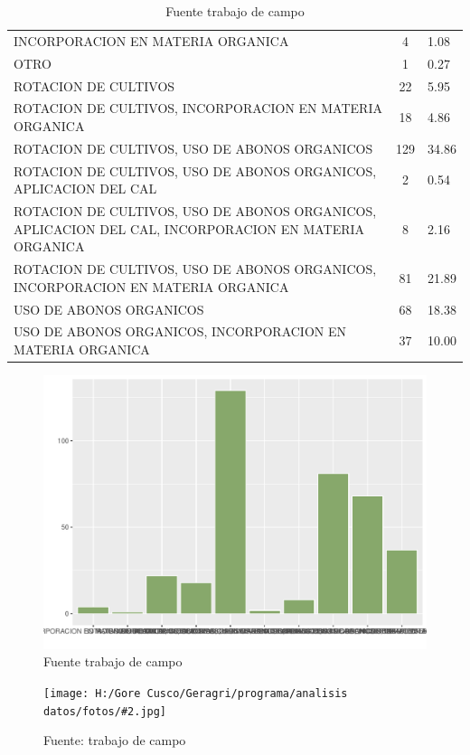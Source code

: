 \documentclass{article}\usepackage[]{graphicx}\usepackage[table]{xcolor}
\makeatletter
\def\maxwidth{ %
  \ifdim\Gin@nat@width>\linewidth
    \linewidth
  \else
    \Gin@nat@width
  \fi
}
\newenvironment{knitrout}{}{} %
\newenvironment{tablas}[2]
{\begin{table}[H]
		\centering
		\caption{#1}
		#2
		\caption*{Fuente trabajo de campo}}
	{\end{table}}
\newenvironment{fotos}[2]
{\begin{figure}[H]
	\centering
	\caption{#1}
	\texttt{[image: H:/Gore Cusco/Geragri/programa/analisis datos/fotos/\#2.jpg]}
	\caption*{Fuente: trabajo de campo}}
{\end{figure}}
\newenvironment{graficas}[2]
{\begin{figure}[H]
		\centering
		\caption{#1}
		#2
		\caption*{Fuente trabajo de campo}}
{\end{figure}}
\makeatother
\begin{document}
\begin{tablas}
{Practica de conservacion de suelos}{

\begin{tabular}{lcl}
\toprule
\cellcolor[HTML]{87A96B}{\textcolor{black}{\textbf{Personas}}} & \cellcolor[HTML]{87A96B}{\textcolor{black}{\textbf{Conteo}}} & \cellcolor[HTML]{87A96B}{\textcolor{black}{\textbf{Porcentaje}}}\\
\midrule
INCORPORACION EN MATERIA ORGANICA & 4 & 1.08\\
OTRO & 1 & 0.27\\
ROTACION DE CULTIVOS & 22 & 5.95\\
ROTACION DE CULTIVOS, INCORPORACION EN MATERIA ORGANICA & 18 & 4.86\\
ROTACION DE CULTIVOS, USO DE ABONOS ORGANICOS & 129 & 34.86\\
\addlinespace
ROTACION DE CULTIVOS, USO DE ABONOS ORGANICOS, APLICACION DEL CAL & 2 & 0.54\\
ROTACION DE CULTIVOS, USO DE ABONOS ORGANICOS, APLICACION DEL CAL, INCORPORACION EN MATERIA ORGANICA & 8 & 2.16\\
ROTACION DE CULTIVOS, USO DE ABONOS ORGANICOS, INCORPORACION EN MATERIA ORGANICA & 81 & 21.89\\
USO DE ABONOS ORGANICOS & 68 & 18.38\\
USO DE ABONOS ORGANICOS, INCORPORACION EN MATERIA ORGANICA & 37 & 10.00\\
\bottomrule
\end{tabular}


}
\end{tablas}
\begin{graficas}
{Practica de conservacion de suelos}{
\begin{knitrout}
\definecolor{shadecolor}{rgb}{0.969, 0.969, 0.969}\color{fgcolor}
\includegraphics[width=\maxwidth]{figure/fig_treintaycuatro-1} 
\end{knitrout}
}
\end{graficas}
\begin{fotos}
{socializacion del proyecto}{32}
\end{fotos}
\end{document}
